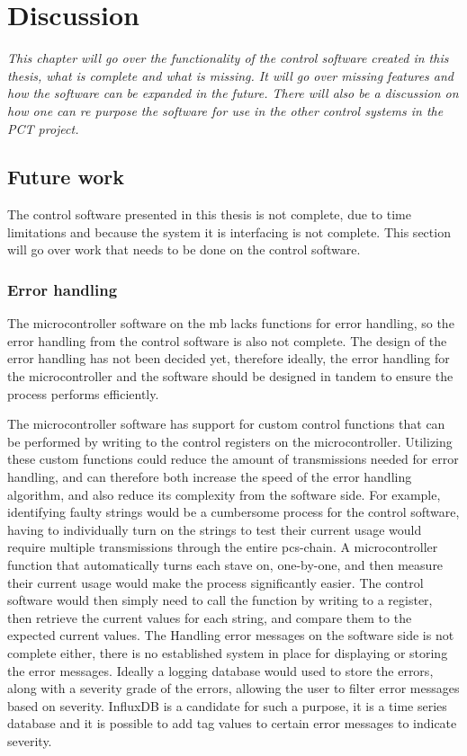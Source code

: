 \documentclass[main.tex]{subfiles}
\begin{document}

\section{Discussion}
\textit{This chapter will go over the functionality of the control software created in this thesis, what is complete and what is missing. It will go over missing features and how the software can be expanded in the future. There will also be a discussion on how one can re purpose the software for use in the other control systems in the PCT project.}

\subsection{Future work}

The control software presented in this thesis is not complete, due to time limitations and because the system it is interfacing is not complete. This section will go over work that needs to be done on the control software.


\subsubsection{Error handling}
The microcontroller software on the \gls{mb} lacks functions for error handling, so the error handling from the control software is also not complete. The design of the error handling has not been decided yet, therefore ideally, the error handling for the microcontroller and the software should be designed in tandem to ensure the process performs efficiently.  

The microcontroller software has support for custom control functions that can be performed by writing to the control registers on the microcontroller. Utilizing these custom functions could reduce the amount of transmissions needed for error handling, and can therefore both increase the speed of the error handling algorithm, and also reduce its complexity from the software side. For example, identifying faulty strings would be a cumbersome process for the control software, having to individually turn on the strings to test their current usage would require multiple transmissions through the entire \gls{pcs}-chain. A microcontroller function that automatically turns each stave on, one-by-one, and then measure their current usage would make the process significantly easier. The control software would then simply need to call the function by writing to a register, then retrieve the current values for each string, and compare them to the expected current values.
 The Handling error messages on the software side is not complete either, there is no established system in place for displaying or storing the error messages. Ideally a logging database would used to store the errors, along with a severity grade of the errors, allowing the user to filter error messages based on severity. InfluxDB is a candidate for such a purpose, it is a time series database and it is possible to add tag values to certain error messages to indicate severity.
 
\end{document}
